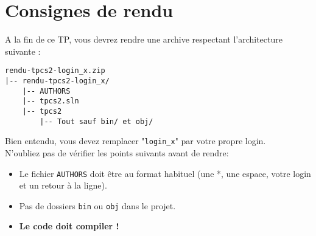 \section{Consignes de rendu}

A la fin de ce TP, vous devrez rendre une archive respectant l'architecture
suivante :\\

\begin{lstlisting}
rendu-tpcs2-login_x.zip
|-- rendu-tpcs2-login_x/
    |-- AUTHORS
    |-- tpcs2.sln
    |-- tpcs2
        |-- Tout sauf bin/ et obj/
\end{lstlisting}
\bigskip

Bien entendu, vous devez remplacer "\texttt{login\_x}" par votre propre
login.\\

N'oubliez pas de vérifier les points suivants avant de rendre:\\

\begin{itemize}
  \item Le fichier \texttt{AUTHORS} doit être au format habituel (une *, une
  espace, votre login et un retour à la ligne).
  \item Pas de dossiers \texttt{bin} ou \texttt{obj} dans le projet.
  \item \textbf{Le code doit compiler !}
\end{itemize}
\bigskip
